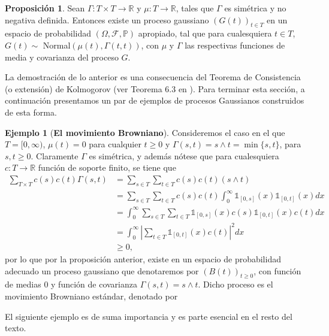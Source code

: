 \documentclass[letterpaper,twoside,12pt]{book}
\newcommand{\R}{\mathbb{R}}
\newcommand{\F}{\mathcal{F}}
\renewcommand{\P}{\mathbb{P}}
\newcommand{\1}{\mathds{1}}
\newcommand{\abs}[1]{\left\lvert #1 \right\rvert}
\renewcommand{\to}{\rightarrow}
\theoremstyle{definition}
\theoremstyle{definition}
\theoremstyle{definition}
\theoremstyle{definition}
\newtheorem{prop}{Proposición}
\theoremstyle{definition}
\theoremstyle{definition}
\newtheorem{ejem}{Ejemplo}
\theoremstyle{definition}
\begin{document}
\begin{prop} 
 Sean $\Gamma:T\times T\to \R$ y $\mu:T\to \R$, tales que $\Gamma$ es simétrica y no negativa definida. Entonces existe un proceso gaussiano $(G(t))_{t\in T}$ en un espacio de probabilidad $(\Omega, \F,\P)$ apropiado, tal que para cualesquiera $t\in T$, $G(t)\sim$ Normal$(\mu(t),\Gamma(t,t))$, con $\mu$ y $\Gamma$ las respectivas funciones de media y covarianza del proceso $G$.
 \end{prop}
 La demostración de lo anterior es una consecuencia del Teorema de Consistencia (o extensión) de Kolmogorov (ver Teorema 6.3 en \cite{LeGall2016} ). Para terminar esta sección, a continuación presentamos un par de ejemplos de procesos Gaussianos construidos de esta forma.
\begin{ejem}[\textbf{El movimiento Browniano}]
Consideremos el caso en el que $T=[0,\infty)$, $\mu(t)=0$ para cualquier $t\geq0$ y $\Gamma(s,t)=s\wedge t=\min\{s,t\}$, para $s,t\geq0$. Claramente $\Gamma$ es simétrica, y además nótese que para cualesquiera $c:T\to\R$ función de soporte finito, se tiene que
\begin{align*}
\sum_{T\times T}^{}c(s)c(t)\Gamma(s,t)&=\sum_{s\in T}^{}\sum_{t\in T}c(s)c(t)(s\wedge t)\\
&=\sum_{s\in T}^{}\sum_{t\in T}c(s)c(t)\int_{0}^{\infty}\1_{[0,s]}(x)\1_{[0,t]}(x)dx\\
&=\int_{0}^{\infty}\sum_{s\in T}\sum_{t\in T}\1_{[0,s]}(x)c(s)\1_{[0,t]}(x)c(t)dx\\
&=\int_{0}^{\infty}\abs{\sum_{t\in T}\1_{[0,t]}(x)c(t)}^2dx\\
&\geq0,
\end{align*}
por lo que por la proposición anterior, existe en un espacio de probabilidad adecuado un proceso gaussiano que denotaremos por $(B(t))_{t\geq0}$, con función de medias 0 y función de covarianza $\Gamma(s,t)=s\wedge t$. Dicho proceso es el movimiento Browniano estándar, denotado por 
 \end{ejem}
El siguiente ejemplo es de suma importancia y es parte esencial en el resto del texto.
\end{document}
